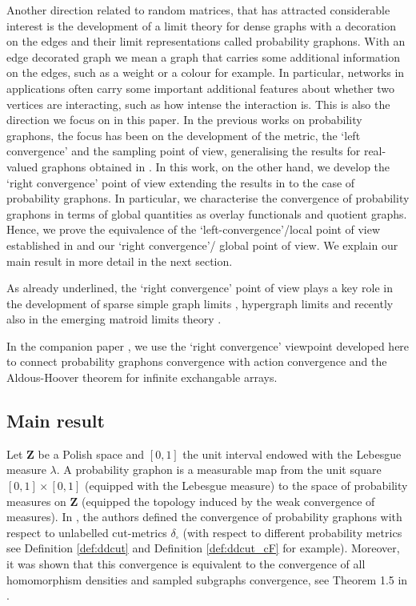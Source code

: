 \documentclass[11pt]{article}
\newcommand{\Space}{\mathbf{Z}}
\begin{document}
Another direction related to random matrices, that has attracted considerable interest is the development of a limit theory for dense graphs with a decoration on the edges \cite{lovász2010limits, falgasravry2016multicolour, KUNSZENTIKOVACS2022109284,abraham2023probabilitygraphons} 
and their limit representations called probability graphons. With an edge decorated graph we mean a graph that carries some additional information on the edges, such as a weight or a colour for example. In particular, networks in applications often carry some important additional features about whether two vertices are interacting, such as how intense the interaction is. This is also the direction we focus on in this paper. In the previous works on probability graphons, the focus has been on the development of the metric, the `left convergence' and the sampling point of view, generalising the results for real-valued graphons obtained in \cite{BORGS20081801}. 
In this work, on the other hand, we develop the `right convergence' point of view extending the results in \cite{borgs2011convergentAnnals} to the case of probability graphons. In particular, we characterise the convergence of probability graphons in terms of global quantities as overlay functionals and quotient graphs.  Hence, we prove the equivalence of the `left-convergence'/local point of view established in \cite{abraham2023probabilitygraphons} and our `right convergence'/ global point of view. We explain our main result in more detail in the next section.

As already underlined, the `right convergence' point of view plays a key role in the development of sparse simple graph limits \cite{backhausz2018action, KUNSZENTIKOVACS20191}, hypergraph limits \cite{HypergraphonsZhao,zucal2023action} and recently also in the emerging matroid limits theory \cite{SubModLovaszquotientconvergence}. 

In the companion paper \cite{NewPreprintGiulio}, we use the `right convergence' viewpoint developed here to connect probability graphons convergence with action convergence \cite{backhausz2018action} and the Aldous-Hoover theorem for infinite exchangable arrays\cite{aldous1981representations,aldous2010exchangeability,hoover1979relations}.


\subsection{Main result}
Let $\Space$ be a Polish space and $[0,1]$ the unit interval endowed with the Lebesgue measure $\lambda$. A probability graphon is a measurable map from the unit square $[0,1]\times [0,1]$ (equipped with the Lebesgue measure) to the space of probability measures on $\Space$ (equipped the topology induced by the weak convergence of measures). In \cite{abraham2023probabilitygraphons}, the authors defined the convergence of probability graphons with respect to unlabelled cut-metrics $\delta_{\square}$ (with respect to different probability metrics see Definition \ref{def:ddcut} and Definition \ref{def:ddcut_cF} for example). Moreover, it was shown that this convergence is equivalent to the convergence of all homomorphism densities and sampled subgraphs convergence, see Theorem 1.5 in \cite{abraham2023probabilitygraphons}.
\end{document}

